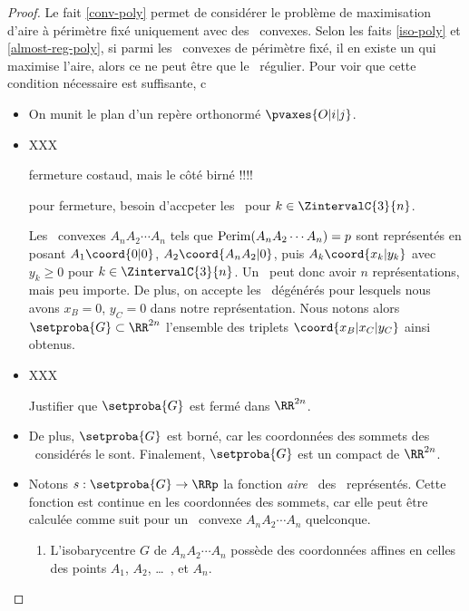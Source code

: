 \begin{proof}
    Le fait \ref{conv-poly} permet de considérer le problème de maximisation d'aire à périmètre fixé uniquement avec des \ngones\ convexes.
    Selon les faits \ref{iso-poly} et \ref{almost-reg-poly}, si parmi les \ngones\ convexes de périmètre fixé, il en existe un qui maximise l'aire, alors ce ne peut être que le \ngone\ régulier.
    Pour voir que cette condition nécessaire est suffisante, c
    \begin{itemize}
        \item On munit le plan d'un repère orthonormé $\pvaxes{O | i | j}$. 

        \item 
        XXX
        
        fermeture costaud, mais le côté birné !!!!
        
        pour fermeture, besoin d'accpeter les \kgones\ pour $k \in \ZintervalC{3}{n}$.
        
        Les \ngones\ convexes $A_n A_2 \cdots A_n$ tels que $\mathrm{Perim}(A_n A_2 \cdots A_n) = p$ sont représentés en posant $A_1\coord{0 | 0}$, $A_2\coord{A_n A_2 | 0}$, puis $A_k\coord{x_k | y_k}$ avec $y_k \geq 0$ pour $k \in \ZintervalC{3}{n}$. Un \ngone\ peut donc avoir $n$ représentations, mais peu importe.
        De plus, on accepte les \ngones\ dégénérés pour lesquels nous avons $x_B = 0$, $y_C = 0$ dans notre représentation.
        Nous notons alors $\setproba{G} \subset \RR^{2n}$ l'ensemble des triplets $\coord{x_B | x_C | y_C}$ ainsi obtenus.

        \item XXX
        
        Justifier que $\setproba{G}$ est fermé dans $\RR^{2n}$.






        \item De plus, $\setproba{G}$ est borné, car les coordonnées des sommets des \kgones\ considérés le sont.        
        Finalement, $\setproba{G}$ est un compact de $\RR^{2n}$.


        \item Notons $s: \setproba{G} \rightarrow \RRp$ la fonction \og \emph{aire} \fg\ des \ngones\ représentés. 
        Cette fonction est continue en les coordonnées des sommets, car elle peut être calculée comme suit pour un \ngone\ convexe $A_n A_2 \cdots A_n$ quelconque.
        \begin{enumerate}
            \item L'isobarycentre $G$ de $A_n A_2 \cdots A_n$ possède des coordonnées affines en celles des points $A_1$, $A_2$, \dots\ , et $A_n$.


\end{enumerate}
\end{itemize}
\end{proof}
